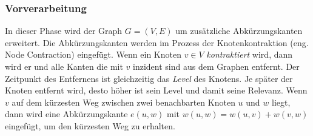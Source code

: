 \subsubsection{Vorverarbeitung}
In dieser Phase wird der Graph $G = (V,E)$ um zusätzliche Abkürzungskanten erweitert. Die
Abkürzungskanten werden im Prozess der Knotenkontraktion (eng. Node Contraction) eingefügt. Wenn ein
Knoten $v \in V$ \emph{kontraktiert} wird, dann wird er und alle Kanten die mit $v$ inzident sind
aus dem Graphen entfernt. Der Zeitpunkt des Entfernens ist gleichzeitig das \emph{Level} des
Knotens. Je später der Knoten entfernt wird, desto höher ist sein Level und damit seine Relevanz.
Wenn $v$ auf dem kürzesten Weg zwischen zwei benachbarten Knoten $u$ und $w$ liegt, dann wird eine
Abkürzungskante $e(u,w)$ mit $w(u,w) = w(u,v) + w(v,w)$ eingefügt, um den kürzesten Weg zu erhalten.

